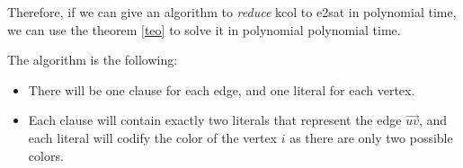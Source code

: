 \documentclass[12pt, a4paper]{article} %
\begin{document}
Therefore, if we can give an algorithm to \textit{reduce} \acrshort{kcol} to \acrshort{e2sat} in polynomial time, we can use the theorem \ref{teo} to solve it in polynomial polynomial time.

The algorithm is the following:

  \begin{itemize}
    \item There will be one clause for each edge, and one literal for each vertex.
    \item Each clause will contain exactly two literals that represent the edge $\vec{uv}$, and each literal will codify the color of the vertex $i$ as there are only two possible colors.
  \end{itemize}
\end{document}
